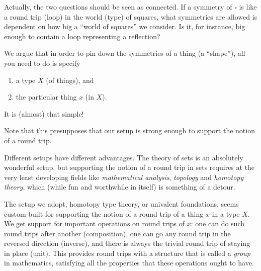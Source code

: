 Actually, the two questions should be seen as connected. 
If a symmetry of $\square$ is like a round trip (loop) 
in the world (type) of squares, what symmetries are allowed is 
dependent on how big a ``world of squares'' we consider. 
Is it, for instance, big enough to contain a loop representing a reflection?

We argue that in order to pin down the symmetries of a thing (a ``shape''), all you need to do is specify
\begin{enumerate}
\item a type $X$ (of things), and
\item the particular thing $x$ (in $X$).
\end{enumerate}
It is (almost) that simple!

Note that this presupposes that our setup is strong enough to support the
notion of a round trip.


Different setups have different advantages.
The theory of sets is an absolutely wonderful setup, but supporting the
notion of a round trip in sets requires at the very least developing fields
like \emph{mathematical analysis}, \emph{topology} and \emph{homotopy theory},
which (while fun and worthwhile in itself) is something of a detour.

The setup we adopt, homotopy type theory, or univalent foundations, 
seems custom-built for supporting the notion of a round trip of
a thing $x$ in a type $X$. 
We get support for important operations on round trips
of $x$: one can do such round trips after another (composition),
one can go any round trip in the reversed direction (inverse), and there
is always the trivial round trip of staying in place (unit).
This provides round trips with a structure that is called a \emph{group}
in mathematics, satisfying all the properties that these operations
ought to have. 

